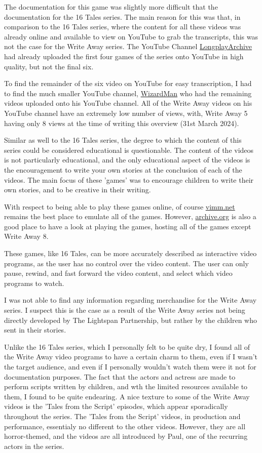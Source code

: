 The documentation for this game was slightly more difficult that the documentation for the 16 Tales series.
The main reason for this was that, in comparison to the 16 Tales series, where the content for all these videos was already online and available to view on YouTube to grab the transcripts, this was not the case for the Write Away series.
The YouTube Channel \href{https://www.youtube.com/@longplayarchive}{LongplayArchive} had already uploaded the first four games of the series onto YouTube in high quality, but not the final six.

To find the remainder of the six video on YouTube for easy transcription, I had to find the much smaller YouTube channel, \href{https://www.youtube.com/@WizardmanTonight}{WizardMan} who had the remaining videos uploaded onto his YouTube channel.
All of the Write Away videos on his YouTube channel have an extremely low number of views, with, Write Away 5 having only 8 views at the time of writing this overview (31st March 2024).

Similar as well to the 16 Tales series, the degree to which the content of this series could be considered educational is questionable.
The content of the videos is not particularly educational, and the only educational aspect of the videos is the encouragement to write your own stories at the conclusion of each of the videos.
The main focus of these 'games' was to encourage children to write their own stories, and to be creative in their writing.

With respect to being able to play these games online, of course \href{https://vimm.net}{vimm.net} remains the best place to emulate all of the games.
However, \href{https://archive.org}{archive.org} is also a good place to have a look at playing the games, hosting all of the games except Write Away 8.

These games, like 16 Tales, can be more accurately described as interactive video programs, as the user has no control over the video content.
The user can only pause, rewind, and fast forward the video content, and select which video programs to watch.

I was not able to find any information regarding merchandise for the Write Away series.
I suspect this is the case as a result of the Write Away series not being directly developed by The Lightspan Partnership, but rather by the children who sent in their stories.

Unlike the 16 Tales series, which I personally felt to be quite dry, I found all of the Write Away video programs to have a certain charm to them, even if I wasn't the target audience, and even if I personally wouldn't watch them were it not for documentation purposes.
The fact that the actors and actress are made to perform scripts written by children, and wth the limited resources available to them, I found to be quite endearing.
A nice texture to some of the Write Away videos is the 'Tales from the Script' episodes, which appear sporadically throughout the series.
The 'Tales from the Script' videos, in production and performance, essentialy no different to the other videos.
However, they are all horror-themed, and the videos are all introduced by Paul, one of the recurring actors in the series.


